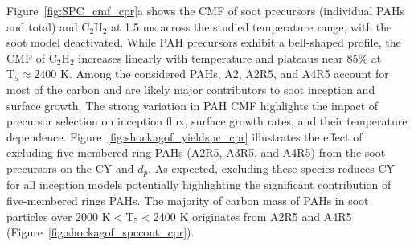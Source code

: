 Figure~\ref{fig:SPC_cmf_cpr}a shows the CMF of soot precursors (individual PAHs and total) and $\mathrm{C_2H_2}$ at 1.5 ms across the studied temperature range, with the soot model deactivated. While PAH precursors exhibit a bell-shaped profile, the CMF of $\mathrm{C_2H_2}$ increases linearly with temperature and plateaus near 85\% at $\mathrm{T_5} \approx 2400$ K. Among the considered PAHs, A2, A2R5, and A4R5 account for most of the carbon and are likely major contributors to soot inception and surface growth. The strong variation in PAH CMF highlights the impact of precursor selection on inception flux, surface growth rates, and their temperature dependence. Figure~\ref{fig:shockagof_yieldspc_cpr} illustrates the effect of excluding five-membered ring PAHs (A2R5, A3R5, and A4R5) from the soot precursors on the CY and $d_p$. As expected, excluding these species reduces CY for all inception models potentially highlighting the significant contribution of five-membered rings PAHs. The majority of carbon mass of PAHs in soot particles over 2000 K$<\mathrm{T_5}<$2400 K originates from A2R5 and A4R5 (Figure~\ref{fig:shockagof_spccont_cpr}).


